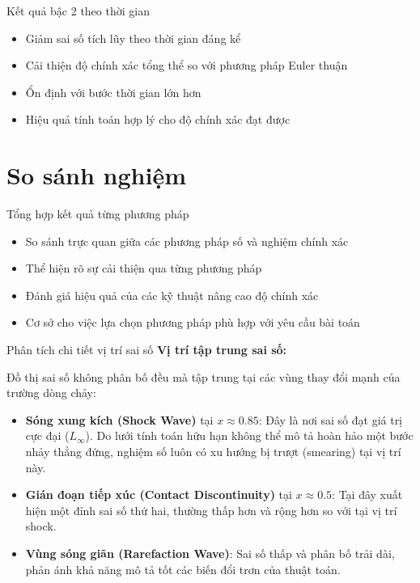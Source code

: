 \documentclass[aspectratio=43,10pt]{beamer}
\begin{document}
\begin{frame}{Kết quả bậc 2 theo thời gian}
\begin{center}
\scalebox{0.6}{}
\end{center}
\vspace{-0.3cm}
\begin{itemize}
    \small
    \item Giảm sai số tích lũy theo thời gian đáng kể
    \item Cải thiện độ chính xác tổng thể so với phương pháp Euler thuận
    \item Ổn định với bước thời gian lớn hơn
    \item Hiệu quả tính toán hợp lý cho độ chính xác đạt được
\end{itemize}
\end{frame}

\section{So sánh nghiệm}

\begin{frame}{Tổng hợp kết quả từng phương pháp}
\begin{center}
\scalebox{0.6}{}
\end{center}
\vspace{-0.3cm}
\begin{itemize}
    \small
    \item So sánh trực quan giữa các phương pháp số và nghiệm chính xác
    \item Thể hiện rõ sự cải thiện qua từng phương pháp
    \item Đánh giá hiệu quả của các kỹ thuật nâng cao độ chính xác
    \item Cơ sở cho việc lựa chọn phương pháp phù hợp với yêu cầu bài toán
\end{itemize}
\end{frame}

\begin{frame}{Phân tích chi tiết vị trí sai số}
\textbf{Vị trí tập trung sai số:}

Đồ thị sai số không phân bố đều mà tập trung tại các vùng thay đổi mạnh của trường dòng chảy:
\begin{itemize}
    \item \textbf{Sóng xung kích (Shock Wave)} tại $x \approx 0.85$: Đây là nơi sai số đạt giá trị cực đại ($L_\infty$). Do lưới tính toán hữu hạn không thể mô tả hoàn hảo một bước nhảy thẳng đứng, nghiệm số luôn có xu hướng bị trượt (smearing) tại vị trí này.
    \item \textbf{Gián đoạn tiếp xúc (Contact Discontinuity)} tại $x \approx 0.5$: Tại đây xuất hiện một đỉnh sai số thứ hai, thường thấp hơn và rộng hơn so với tại vị trí shock.
    \item \textbf{Vùng sóng giãn (Rarefaction Wave)}: Sai số thấp và phân bố trải dài, phản ánh khả năng mô tả tốt các biến đổi trơn của thuật toán.
\end{itemize}
\end{frame}
\end{document}
